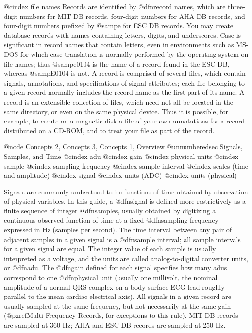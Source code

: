 @cindex file names
Records are identified by @dfn{record names}, which are three-digit
numbers for MIT DB records, four-digit numbers for AHA DB records, and
four-digit numbers prefixed by @samp{e} for ESC DB records.  You may
create database records with names containing letters, digits, and
underscores.  Case is significant in record names that contain letters,
even in environments such as MS-DOS for which case translation is
normally performed by the operating system on file names; thus
@samp{e0104} is the name of a record found in the ESC DB, whereas
@samp{E0104} is not.  A record is comprised of several files, which
contain signals, annotations, and specifications of signal attributes;
each file belonging to a given record normally includes the record name
as the first part of its name.  A record is an extensible collection of
files, which need not all be located in the same directory, or even on
the same physical device.  Thus it is possible, for example, to create
on a magnetic disk a file of your own annotations for a record
distributed on a CD-ROM, and to treat your file as part of the record.

@node     Concepts 2, Concepts 3, Concepts 1, Overview
@unnumberedsec Signals, Samples, and Time
@cindex adu
@cindex gain
@cindex physical units
@cindex sample
@cindex sampling frequency
@cindex sample interval
@cindex scales (time and amplitude)
@cindex signal
@cindex units (ADC)
@cindex units (physical)

Signals are commonly understood to be functions of time obtained by
observation of physical variables.  In this guide, a @dfn{signal} is
defined more restrictively as a finite sequence of integer
@dfn{samples}, usually obtained by digitizing a continuous observed
function of time at a fixed @dfn{sampling frequency} expressed in Hz
(samples per second).  The time interval between any pair of adjacent
samples in a given signal is a @dfn{sample interval}; all sample
intervals for a given signal are equal.  The integer value of each
sample is usually interpreted as a voltage, and the units are called
analog-to-digital converter units, or @dfn{adu}.  The @dfn{gain} defined
for each signal specifies how many adus correspond to one @dfn{physical
unit} (usually one millivolt, the nominal amplitude of a normal QRS
complex on a body-surface ECG lead roughly parallel to the mean cardiac
electrical axis).  All signals in a given record are usually sampled at
the same frequency, but not necessarily at the same gain
(@pxref{Multi-Frequency Records}, for exceptions to
this rule).  MIT DB records are sampled at 360 Hz; AHA and ESC DB
records are sampled at 250 Hz.

